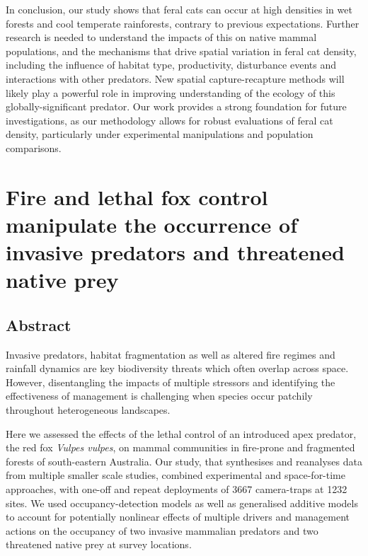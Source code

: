 \documentclass[11pt,a4paper,titlepage,twoside,openright]{style/unimelbthesis}
\begin{document}
\begin{mainmatter}
In conclusion, our study shows that feral cats can occur at high densities in wet forests and cool temperate rainforests, contrary to previous expectations. Further research is needed to understand the impacts of this on native mammal populations, and the mechanisms that drive spatial variation in feral cat density, including the influence of habitat type, productivity, disturbance events and interactions with other predators. New spatial capture-recapture methods will likely play a powerful role in improving understanding of the ecology of this globally-significant predator. Our work provides a strong foundation for future investigations, as our methodology allows for robust evaluations of feral cat density, particularly under experimental manipulations and population comparisons.

\hypertarget{occ}{%
\chapter{Fire and lethal fox control manipulate the occurrence of invasive predators and threatened native prey}\label{occ}}

\hypertarget{abstract-1}{%
\section*{Abstract}\label{abstract-1}}

Invasive predators, habitat fragmentation as well as altered fire regimes and rainfall dynamics are key biodiversity threats which often overlap across space. However, disentangling the impacts of multiple stressors and identifying the effectiveness of management is challenging when species occur patchily throughout heterogeneous landscapes.

Here we assessed the effects of the lethal control of an introduced apex predator, the red fox \emph{Vulpes vulpes}, on mammal communities in fire-prone and fragmented forests of south-eastern Australia. Our study, that synthesises and reanalyses data from multiple smaller scale studies, combined experimental and space-for-time approaches, with one-off and repeat deployments of 3667 camera-traps at 1232 sites. We used occupancy-detection models as well as generalised additive models to account for potentially nonlinear effects of multiple drivers and management actions on the occupancy of two invasive mammalian predators and two threatened native prey at survey locations.


\end{mainmatter}
\end{document}
